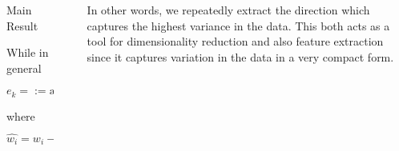 \documentclass[final]{beamer}
\newlength{\sepwid}
\newlength{\onecolwid}
\newlength{\middlecolwid}
\begin{document}
\begin{frame}[t]
\begin{columns}[t]
\begin{column}{\middlecolwid}
\begin{alertblock}{Main Result}
\end{alertblock}

\vspace{-5mm}

\begin{block}


While in general 
\begin{equation*}
e_k = := \text{arg max}_{||e||=1} \Big(\sum_{i}^M \Big\langle \hat{w_i}, e\Big\rangle^2 \Big)
\end{equation*}
where 
\begin{equation*}
\hat{w_i} = w_i - \sum_{i =1}^{k-1} w_i e_i e_i^T.
\end{equation*}


\end{block}
\end{column} %


\begin{column}{\sepwid}\end{column} %

\begin{column}{\onecolwid} %




\begin{block}

In other words, we repeatedly extract the direction which captures the highest variance in the data. This both acts as a tool for dimensionality reduction and also feature extraction since it captures variation in the data in a very compact form.

\end{block}


\end{column}
\end{columns}
\end{frame}
\end{document}
